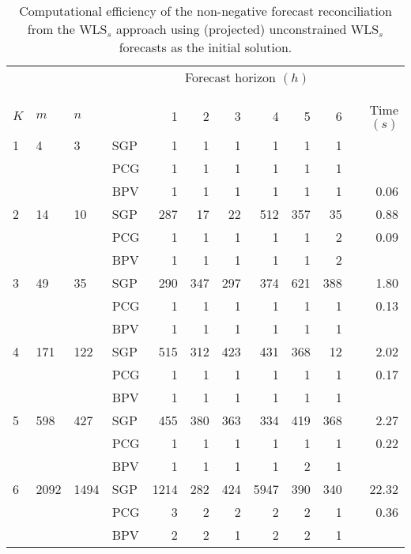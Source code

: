 \documentclass[11pt]{article}
\newcommand{\0}{\phantom{0}}
\begin{document}
\begin{table}[ht]
	\small
	\tabcolsep=0.20cm
	\captionsetup{belowskip=0pt, aboveskip=4pt}
	\caption{Computational efficiency of the non-negative forecast reconciliation from the WLS$_{s}$ approach using (projected) unconstrained WLS$_{s}$ forecasts as the initial solution.}
	\label{tbl:perfnnwlsp}
	\centering
	\begin{threeparttable}
		\begin{tabular}{llllrrrrrrr}
			\toprule
			& & & & \multicolumn{6}{c}{Forecast horizon $(h)$}\\[-0.4cm]\\\cline{5-10}\\[-0.3cm]
			$K$ & $m$ & $n$ & & 1 & 2 & 3 & 4 & 5 & 6 & Time $(s)$\\
			\midrule
			1 & 4 & 3 & SGP & 1 & 1 & 1 & 1 & 1 & 1 & \bm{$0.03$} \\
			& & & PCG & 1 & 1 & 1 & 1 & 1 & 1 & \bm{$0.03$} \\
			& & & BPV & 1 & 1 & 1 & 1 & 1 & 1 & 0.06 \\
			\midrule
			2 & 14 & 10 & SGP & 287 & 17 & 22 & 512 & 357 & 35 & 0.88 \\
			& & & PCG & 1 & 1 & 1 & 1 & 1 & 2 & 0.09 \\
			& & & BPV & 1 & 1 & 1 & 1 & 1 & 2 & \bm{$0.08$} \\
			\midrule
			3 & 49 & 35 & SGP & 290 & 347 & 297 & 374 & 621 & 388 & 1.80 \\
			& & & PCG & 1 & 1 & 1 & 1 & 1 & 1 & 0.13 \\
			& & & BPV & 1 & 1 & 1 & 1 & 1 & 1 & \bm{$0.07$} \\
			\midrule
			4 & 171 & 122 & SGP & 515 & 312 & 423 & 431 & 368 & 12 & 2.02 \\
			& & & PCG & 1 & 1 & 1 & 1 & 1 & 1 & 0.17 \\
			& & & BPV & 1 & 1 & 1 & 1 & 1 & 1 & \bm{$0.09$} \\
			\midrule
			5 & 598 & 427 & SGP & 455 & 380 & 363 & 334 & 419 & 368 & 2.27 \\
			& & & PCG & 1 & 1 & 1 & 1 & 1 & 1 & 0.22 \\
			& & & BPV & 1 & 1 & 1 & 1 & 2 & 1 & \bm{$0.12$} \\
			\midrule
			6 & 2092 & 1494 & SGP & 1214 & 282 & 424 & 5947 & 390 & 340 & 22.32 \\
			& & & PCG & 3 & 2 & 2 & 2 & 2 & 1 & 0.36 \\
			& & & BPV & 2 & 2 & 1 & 2 & 2 & 1 & \bm{$0.17$} \\

\end{tabular}
\end{threeparttable}
\end{table}
\end{document}
